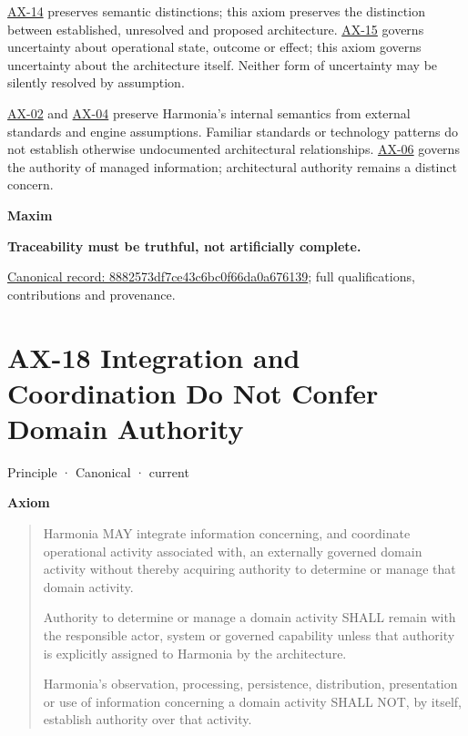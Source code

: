 \hyperref[element:d3fc6025dc7646d1b2020b51f7a44bfa]{AX-14} preserves semantic
distinctions; this axiom preserves the distinction between established,
unresolved and proposed architecture.
\hyperref[element:ef8abbaec37e4890ad78b9f263e67906]{AX-15} governs uncertainty
about operational state, outcome or effect; this axiom governs uncertainty
about the architecture itself. Neither form of uncertainty may be silently
resolved by assumption.



\hyperref[element:eee8c3783d964d18a7f9dcea85fcd4cf]{AX-02}
and \hyperref[element:54508cda80484a6caf95b901780eaf7d]{AX-04}
preserve Harmonia's internal semantics from external standards and engine
assumptions. Familiar standards or technology patterns do not establish
otherwise undocumented architectural relationships.
\hyperref[element:952c3b6148ce4fce94b69f99a0c2fec7]{AX-06} governs the authority
of managed information; architectural authority remains a distinct concern.



\par\medskip\textbf{Maxim}\par


\textbf{Traceability must be truthful, not artificially complete.}


{\footnotesize \href{../../../../continuum/motivation/principle/8882573df7ce43c6bc0f66da0a676139.md}{Canonical record: 8882573df7ce43c6bc0f66da0a676139}; full qualifications, contributions and provenance.}\par
\section{AX-18 Integration and Coordination Do Not Confer Domain Authority}

\label{element:b8cafe3cf5904d2bb9a9767260fddf78}
{\small Principle · Canonical · current}\par

\par\medskip\textbf{Axiom}\par


\begin{quote}


Harmonia MAY integrate information concerning, and coordinate operational activity associated with, an externally governed domain activity without thereby acquiring authority to determine or manage that domain activity.



Authority to determine or manage a domain activity SHALL remain with the responsible actor, system or governed capability unless that authority is explicitly assigned to Harmonia by the architecture.



Harmonia's observation, processing, persistence, distribution, presentation or use of information concerning a domain activity SHALL NOT, by itself, establish authority over that activity.



\end{quote}


